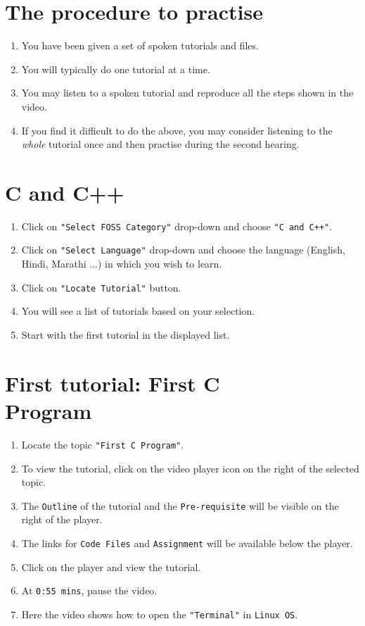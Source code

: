 \documentclass[11pt]{article}
\newenvironment{enumcpt}{\begin{enumerate} \topsep 0pt \partopsep 0pt 
	\parsep 0pt
	\itemsep 0pt \leftmargin -1in \rightmargin 0pt
}{\end{enumerate}}
\begin{document}
\begin{multicols}{2}

\section{The procedure to practise}
  \begin{enumcpt}
\item You have been given a set of spoken tutorials and files.
\item You will typically do one tutorial at a time.
\item You may listen to a spoken tutorial and reproduce all the steps shown in the video.
\item If you find it difficult to do the above, you may consider listening to the \emph{whole} tutorial once and then practise during the second hearing.
  \end{enumcpt}
 
  
  \section{C and C++}
  \begin{enumcpt}
  	\item Click on {\tt "Select FOSS Category"} drop-down and choose {\tt "C and C++"}.
	\item Click on {\tt "Select Language"} drop-down and choose the language (English, Hindi, Marathi ...) in which you wish to learn.
	\item Click on {\tt "Locate Tutorial"} button.
	\item You will see a list of tutorials based on your selection.
	\item Start with the first tutorial in the displayed list.
  \end{enumcpt}

\section{First tutorial: First C \\ Program}
 \begin{enumcpt}
  	\item Locate the topic {\tt "First C Program"}.
 	\item To view the tutorial, click on the video player icon on the right of the selected topic.
  	\item The {\tt Outline} of the tutorial and the {\tt Pre-requisite} will be visible on the right of the player.
  	\item The links for {\tt Code Files} and {\tt Assignment} will be available below the player.
  	\item Click on the player and view the tutorial.
	\item At {\tt 0:55 mins}, pause the video. 
	\item Here the video shows how to open the {\tt "Terminal"} in {\tt Linux OS}.


\end{enumcpt}
\end{multicols}
\end{document}
